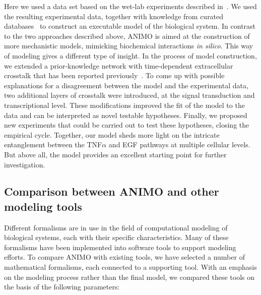 \documentclass{bmcart}
\begin{document}
Here we used a data set based on the wet-lab experiments described in~\cite{pathway-compendium}. We used the
resulting experimental data, together with knowledge from curated databases~\cite{kegg,phosphosite}
to construct an executable model of the biological system.
In contrast to the two approaches described above, ANIMO is aimed at the construction of
more mechanistic models, mimicking biochemical interactions \emph{in silico}. This way of modeling
gives a different type of insight. In the process of model construction, we extended a
prior-knowledge network with time-dependent extracellular crosstalk that has been reported
previously~\cite{pathway-autocrine}. To come up with possible explanations for a disagreement
between the model and the experimental data, two additional layers of
crosstalk were introduced, at the signal transduction and transcriptional level. These modifications
improved the fit of the model to the data and can be interpreted as novel testable hypotheses.
Finally, we proposed new experiments that could be carried out to test these hypotheses, closing the empirical cycle.
Together, our model sheds more light on the intricate
entanglement between the TNF$\alpha$ and EGF pathways at multiple cellular levels.
But above all,  the model provides an excellent starting point for further investigation.


\subsection*{Comparison between ANIMO and other modeling tools}\label{suppl:comparison-table}
Different formalisms are in use in the field of computational
modeling of biological systems, each with their specific characteristics.
Many of these formalisms have been implemented into
software tools to support modeling efforts. To compare
ANIMO with existing tools, we have selected a number of mathematical formalisms,
each connected to a supporting tool. With an emphasis on the modeling
process rather than the final model, we compared these tools on
the basis of the following parameters:
\end{document}
